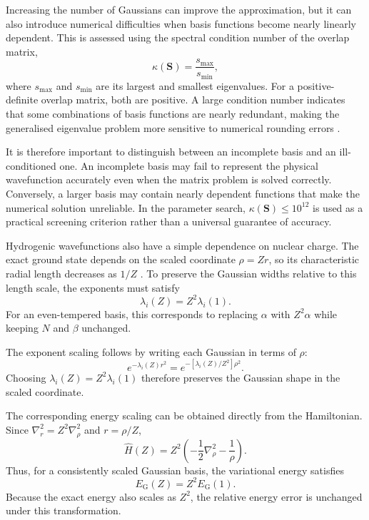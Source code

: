 Increasing the number of Gaussians
can improve the approximation,
but it can also introduce numerical
difficulties when basis functions
become nearly linearly dependent.
This is assessed using the spectral
condition number of the overlap
matrix,
\begin{equation}
    \kappa(\mathbf S)
    =\frac{s_{\max}}{s_{\min}},
    \label{eq:condition_number}
\end{equation}
where $s_{\max}$ and $s_{\min}$
are its largest and smallest
eigenvalues. For a positive-definite
overlap matrix, both are positive.
A large condition number indicates
that some combinations of basis
functions are nearly redundant,
making the generalised eigenvalue
problem more sensitive to numerical
rounding errors \cite{Lehtola2019}.

It is therefore important to
distinguish between an incomplete
basis and an ill-conditioned one.
An incomplete basis may fail to
represent the physical wavefunction
accurately even when the matrix
problem is solved correctly.
Conversely, a larger basis may
contain nearly dependent functions
that make the numerical solution
unreliable. In the parameter
search, $\kappa(\mathbf S)\leq10^{12}$
is used as a practical screening
criterion rather than a universal
guarantee of accuracy.

Hydrogenic wavefunctions also have
a simple dependence on nuclear
charge. The exact ground state
depends on the scaled coordinate
$\rho=Zr$, so its characteristic
radial length decreases as $1/Z$
\cite{bransden_physics_2009}.
To preserve the Gaussian widths
relative to this length scale,
the exponents must satisfy
\begin{equation}
    \lambda_i(Z)=Z^2\lambda_i(1).
    \label{eq:scaled_exponents}
\end{equation}
For an even-tempered basis,
this corresponds to replacing
$\alpha$ with $Z^2\alpha$ while
keeping $N$ and $\beta$ unchanged.

The exponent scaling follows
by writing each Gaussian in
terms of $\rho$:
\[
    e^{-\lambda_i(Z)r^2}
    =e^{-[\lambda_i(Z)/Z^2]\rho^2}.
\]
Choosing $\lambda_i(Z)=Z^2\lambda_i(1)$
therefore preserves the Gaussian
shape in the scaled coordinate.

The corresponding energy scaling
can be obtained directly from the
Hamiltonian. Since
$\nabla_r^2=Z^2\nabla_\rho^2$
and $r=\rho/Z$,
\[
    \hat H(Z)
    =Z^2\left(
        -\frac12\nabla_\rho^2-\frac{1}{\rho}
      \right).
\]
Thus, for a consistently scaled
Gaussian basis, the variational
energy satisfies
\begin{equation}
    E_{\mathrm G}(Z)=Z^2E_{\mathrm G}(1).
    \label{eq:scaled_energy}
\end{equation}
Because the exact energy also
scales as $Z^2$, the relative
energy error is unchanged under
this transformation.

